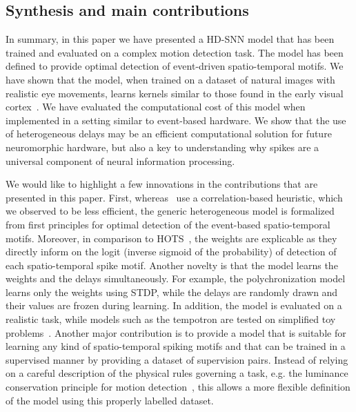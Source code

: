 \documentclass[default]{sn-jnl}%
\theoremstyle{thmstyleone}%
\theoremstyle{thmstyletwo}%
\theoremstyle{thmstylethree}%
\begin{document}
\subsection{Synthesis and main contributions}
In summary, in this paper we have presented a HD-SNN model that has been trained and evaluated on a complex motion detection task. The model has been defined to provide optimal detection of event-driven spatio-temporal motifs. We have shown that the model, when trained on a dataset of natural images with realistic eye movements, learns kernels similar to those found in the early visual cortex~\cite{kremkow_push-pull_2016}. %
We have evaluated the computational cost of this model when implemented in a setting similar to event-based hardware. We show that the use of heterogeneous delays may be an efficient computational solution for future neuromorphic hardware, but also a key to understanding why spikes are a universal component of neural information processing.

We would like to highlight a few innovations in the contributions that are presented in this paper. First, whereas~\citep{ghosh_spatiotemporal_2019,yu_stsc-snn_2022} use a correlation-based heuristic, which we observed to be less efficient, the generic heterogeneous model is formalized from first principles for optimal detection of the event-based spatio-temporal motifs. Moreover, in comparison to HOTS~\citep{lagorce_hots_2017}, the weights are explicable as they directly inform on the logit (inverse sigmoid of the probability) of detection of each spatio-temporal spike motif. Another novelty is that the model learns the weights and the delays simultaneously. For example, the polychronization model~\citep{izhikevich_polychronization_2006} learns only the weights using STDP, while the delays are randomly drawn and their values are frozen during learning. In addition, the model is evaluated on a realistic task, while models such as the tempotron are tested on simplified toy problems~\citep{gutig_tempotron_2006}. Another major contribution is to provide a model that is suitable for learning any kind of spatio-temporal spiking motifs and that can be trained in a supervised manner by providing a dataset of supervision pairs. Instead of relying on a careful description of the physical rules governing a task, e.g. the luminance conservation principle for motion detection~\citep{benosman_asynchronous_2012, dardelet_event-by-event_2021}, this allows a more flexible definition of the model using this properly labelled dataset.
%
\end{document}

